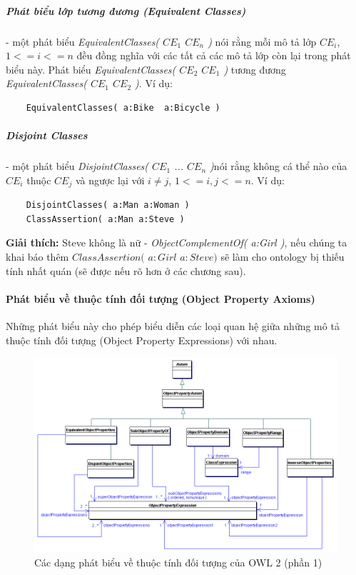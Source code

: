 	\subparagraph{Phát biểu lớp tương đương (Equivalent Classes)} - một phát biểu \textit{EquivalentClasses( $CE_{1}$ $CE_{n}$ )} nói rằng mỗi mô tả lớp $CE_{i}$, $1<=i<=n$ đều đồng nghĩa với các tất cả các mô tả lớp còn lại trong phát biểu này. Phát biểu \textit{EquivalentClasses( $CE_{2}$ $CE_{1}$ )} tương đương \textit{EquivalentClasses( $CE_{1}$ $CE_{2}$ )}. Ví dụ:
	\begin{verbatim}
	EquivalentClasses( a:Bike  a:Bicycle )
	\end{verbatim}
	
	\subparagraph{Disjoint Classes} - một phát biểu \textit{DisjointClasses( $CE_{1}$ ... $CE_{n}$ )}nói rằng không cá thể nào của $CE_{i}$ thuộc $CE_{j}$ và ngược lại với $i \neq j$, $1<=i,j<=n$. Ví dụ:
	\begin{verbatim}
	DisjointClasses( a:Man a:Woman )	
	ClassAssertion( a:Man a:Steve )
	\end{verbatim}
	\textbf{Giải thích:} Steve không là nữ - \textit{ObjectComplementOf( a:Girl )}, nếu chúng ta khai báo thêm $ClassAssertion($ $a:Girl$ $a:Steve)$ sẽ làm cho ontology bị thiếu tính nhất quán (sẽ được nếu rõ hơn ở các chương sau).
	
	\paragraph{Phát biểu về thuộc tính đối tượng (Object Property Axioms)}
	Những phát biểu này cho phép biểu diễn các loại quan hệ giữa những mô tả thuộc tính đối tượng (Object Property Expressions) với nhau.
	\begin{figure}[h]
		\centering
		\includegraphics[width=160mm]{Figures/objectpropertyAxiom.png}
		\caption{Các dạng phát biểu về thuộc tính đối tượng của OWL 2 (phần 1)\label{overflow}}
	\end{figure}
	
